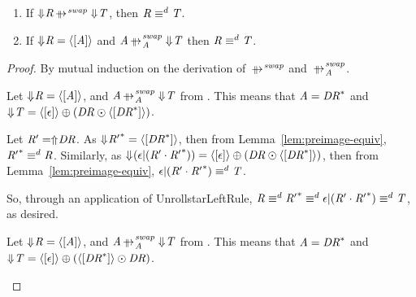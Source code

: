 \documentclass[numbers,10pt,preprint\ifanon ,nocopyrightspace\fi]{sigplanconf}
\begin{document}
\begin{lemma}
  \label{lem:express-swap-in-equiv}
  \leavevmode
  \begin{enumerate}
  \item If $\ToDNFRegexOf{\Regex} \ParallelRewriteSwap \ToDNFRegexOf{\RegexAlt}$, then
    $\mathit{R} \equiv^d \mathit{T}$.
  \item If $\Downarrow\mkern-4mu \mathit{R} = \langle[\mathit{A}]\rangle$ and
    $\Atom \ParallelRewriteSwapAtom \ToDNFRegexOf{\RegexAlt}$ then
    $\mathit{R} \equiv^d \mathit{T}$.
  \end{enumerate}
\end{lemma}
\begin{proof}By mutual induction on the derivation of $\ParallelRewriteSwap$ and
  $\ParallelRewriteSwapAtom$.
  \begin{case}[\AtomUnrollstarLeftRule{}]
    Let $\Downarrow\mkern-4mu \mathit{R} = \langle[\mathit{A}]\rangle$, and
    $\Atom \ParallelRewriteSwapAtom \ToDNFRegexOf{\RegexAlt}$ from
    \AtomUnrollstarLeftRule{}.
    This means that $\mathit{A} = {\mathit{DR}}^*$ and
    $\Downarrow\mkern-4mu \mathit{T} = \langle[\epsilon]\rangle\oplus(\mathit{DR}\odot\langle[{\mathit{DR}}^*]\rangle)$.

    Let $\mathit{R}' = \Uparrow\mkern-4mu \mathit{DR}$.
    As $\Downarrow\mkern-4mu {\mathit{R}'}^* =
    \langle[{\mathit{DR}}^*]\rangle$, then from
    Lemma~\ref{lem:preimage-equiv}, ${\mathit{R}'}^*
    \equiv^d \mathit{R}$.
    Similarly, as $\Downarrow\mkern-4mu (\epsilon |
      (\mathit{R}'\cdot{\ensuremath{\mathit{R}}'}^*)) =
    \langle[\epsilon]\rangle\oplus(\mathit{DR}\odot\langle[{\mathit{DR}}^*]\rangle)$,
    then from
    Lemma~\ref{lem:preimage-equiv}, $\epsilon |
    (\mathit{R}'\cdot{\ensuremath{\mathit{R}}'}^*) \equiv^d \mathit{T}$.

    So, through an application of UnrollstarLeftRule{},
    $\mathit{R} \equiv^d {\mathit{R}'}^* \equiv^d
    \epsilon |
    (\mathit{R}'\cdot{\ensuremath{\mathit{R}}'}^*) \equiv^d \mathit{T}$, as desired.
  \end{case}

  \begin{case}[\AtomUnrollstarRightRule{}]
    Let $\Downarrow\mkern-4mu \mathit{R} = \langle[\mathit{A}]\rangle$, and
    $\Atom \ParallelRewriteSwapAtom \ToDNFRegexOf{\RegexAlt}$ from
    \AtomUnrollstarRightRule{}.
    This means that $\mathit{A} = {\mathit{DR}}^*$ and
    $\Downarrow\mkern-4mu \mathit{T} = \langle[\epsilon]\rangle\oplus(\langle[{\mathit{DR}}^*]\rangle\odot\mathit{DR})$.


\end{case}
\end{proof}
\end{document}
